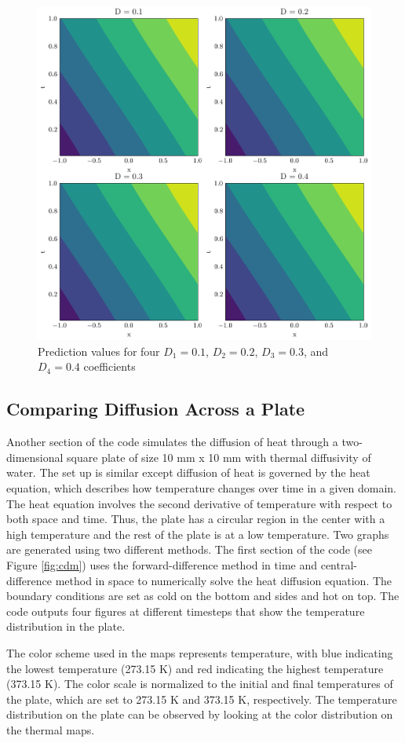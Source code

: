 \begin{figure}[htb!]
\begin{center}
\includegraphics[width=.49\textwidth]{images/all.png}
\vspace*{-8mm}
\caption{Prediction values for four $D_1=0.1$, $D_2=0.2$, $D_3=0.3$, and $D_4=0.4$ coefficients}
\label{fig:alld}
\end{center}
\end{figure}

\subsection{Comparing Diffusion Across a Plate }
Another section of the code simulates the diffusion of heat through a two-dimensional square plate of size 10 mm x 10 mm with thermal diffusivity of water. The set up is similar except  diffusion of heat is governed by the heat equation, which describes how temperature changes over time in a given domain. The heat equation involves the second derivative of temperature with respect to both space and time. Thus, the plate has a circular region in the center with a high temperature and the rest of the plate is at a low temperature. Two graphs are generated using two different methods. The first section of the code (see Figure \ref{fig:cdm}) uses the forward-difference method in time and central-difference method in space to numerically solve the heat diffusion equation. The boundary conditions are set as cold on the bottom and sides and hot on top. The code outputs four figures at different timesteps that show the temperature distribution in the plate. 

The color scheme used in the maps represents temperature, with blue indicating the lowest temperature (273.15 K) and red indicating the highest temperature (373.15 K). The color scale is normalized to the initial and final temperatures of the plate, which are set to 273.15 K and 373.15 K, respectively. The temperature distribution on the plate can be observed by looking at the color distribution on the thermal maps.

